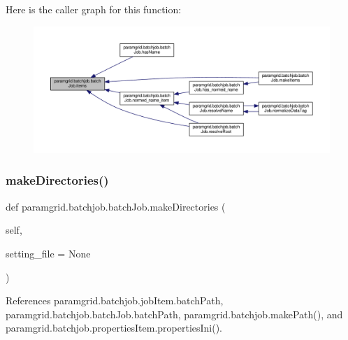 Here is the caller graph for this function\+:
\nopagebreak
\begin{figure}[H]
\begin{center}
\leavevmode
\includegraphics[width=350pt]{classparamgrid_1_1batchjob_1_1batchJob_a00d5bd2488a8806f4fb864d54fe01a7e_icgraph}
\end{center}
\end{figure}
\mbox{\label{classparamgrid_1_1batchjob_1_1batchJob_a57b86d97815822c389607772822f7e93}} 
\subsubsection{\texorpdfstring{make\+Directories()}{makeDirectories()}}
{\footnotesize\ttfamily def paramgrid.\+batchjob.\+batch\+Job.\+make\+Directories (\begin{DoxyParamCaption}\item[{}]{self,  }\item[{}]{setting\+\_\+file = {\ttfamily None} }\end{DoxyParamCaption})}



References paramgrid.\+batchjob.\+job\+Item.\+batch\+Path, paramgrid.\+batchjob.\+batch\+Job.\+batch\+Path, paramgrid.\+batchjob.\+make\+Path(), and paramgrid.\+batchjob.\+properties\+Item.\+properties\+Ini().

